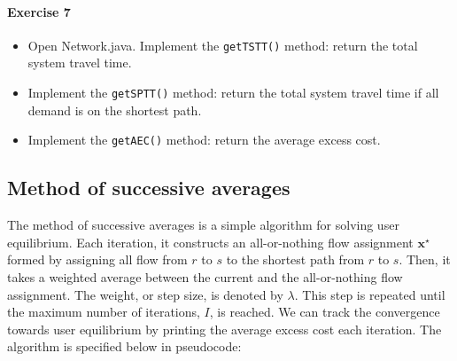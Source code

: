 \documentclass[11pt]{article}
\begin{document}
\paragraph*{Exercise 7} 
\begin{itemize}
	\item Open Network.java. Implement the \texttt{getTSTT()} method: return the total system travel time.
	\item Implement the \texttt{getSPTT()} method: return the total system travel time if all demand is on the shortest path. 
	
	\item Implement the \texttt{getAEC()} method: return the average excess cost. 
\end{itemize}



\subsection{Method of successive averages}


The method of successive averages is a simple algorithm for solving user equilibrium. Each iteration, it constructs an all-or-nothing flow assignment $\mathbf{x}^\star$ formed by assigning all flow from $r$ to $s$ to the shortest path from $r$ to $s$. Then, it takes a weighted average between the current and the all-or-nothing flow assignment. The weight, or step size, is denoted by $\lambda$. 
This step is repeated until the maximum number of iterations, $I$, is reached. We can track the convergence towards user equilibrium by printing the average excess cost each iteration.
The algorithm is specified below in pseudocode:

\vspace{\baselineskip}
\end{document}
